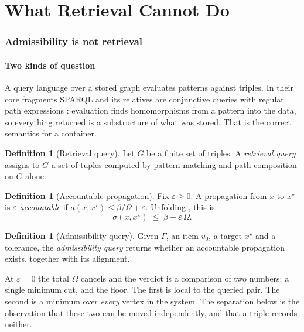 \documentclass[11pt,twocolumn,a4paper]{article}
\theoremstyle{thmstyle}
\theoremstyle{definition}
\newtheorem{definition}[theorem]{Definition}
\theoremstyle{remark}
\newcommand{\Gph}{\Gamma}
\newcommand{\flo}{\beta}
\newcommand{\sepc}{\sigma}
\newcommand{\Tot}{\Omega}
\begin{document}
\part{What Retrieval Cannot Do}

\section{Admissibility is not retrieval}
\label{sec:separation}

\subsection{Two kinds of question}

A query language over a stored graph evaluates patterns against triples. In
their core fragments SPARQL and its relatives are conjunctive queries with
regular path expressions \citep{perez2009,angles2017}: evaluation finds
homomorphisms from a pattern into the data, so everything returned is a
substructure of what was stored. That is the correct semantics for a
container.

\begin{definition}[Retrieval query]
\label{def:retrieval}
Let $G$ be a finite set of triples. A \emph{retrieval query} assigns to $G$ a
set of tuples computed by pattern matching and path composition on $G$ alone.
\end{definition}

\begin{definition}[Accountable propagation]
\label{def:accountable}
Fix $\varepsilon \geq 0$. A propagation from $x$ to $x^\star$ is
\emph{$\varepsilon$-accountable} if
$a(x,x^\star) \leq \flo/\Tot + \varepsilon$. Unfolding
, this is
\begin{equation}
\sepc(x,x^\star) \;\leq\; \flo + \varepsilon\,\Tot .
\label{eq:accunfolded}
\end{equation}
\end{definition}

\begin{definition}[Admissibility query]
\label{def:admissibility}
Given $\Gph$, an item $v_0$, a target $x^\star$ and a tolerance, the
\emph{admissibility query} returns whether an accountable propagation exists,
together with its alignment.
\end{definition}

At $\varepsilon=0$ the total $\Tot$ cancels and the verdict is a comparison of
two numbers: a single minimum cut, and the floor. The first is local to the
queried pair. The second is a minimum over \emph{every} vertex in the system.
The separation below is the observation that these two can be moved
independently, and that a triple records neither.
\end{document}
